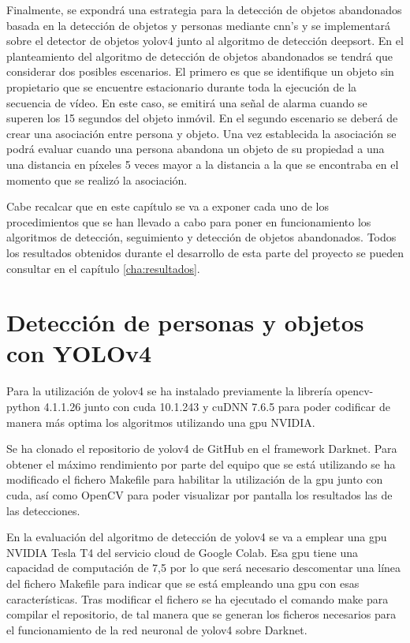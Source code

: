Finalmente, se expondrá una estrategia para la detección de objetos abandonados basada en la detección de objetos y personas mediante \gls{cnn}'s y se implementará sobre el detector de objetos \gls{yolov4} junto al algoritmo de detección \gls{deepsort}. En el planteamiento del algoritmo de detección de objetos abandonados se tendrá que considerar dos posibles escenarios. El primero es que se identifique un objeto sin propietario que se encuentre estacionario durante toda la ejecución de la secuencia de vídeo. En este caso, se emitirá una señal de alarma cuando se superen los 15 segundos del objeto inmóvil. En el segundo escenario se deberá de crear una asociación entre persona y objeto. Una vez establecida la asociación se podrá evaluar cuando una persona abandona un objeto de su propiedad a una una distancia en píxeles 5 veces mayor a la distancia a la que se encontraba en el momento que se realizó la asociación.

Cabe recalcar que en este capítulo se va a exponer cada uno de los procedimientos que se han llevado a cabo para poner en funcionamiento los algoritmos de detección, seguimiento y detección de objetos abandonados. Todos los resultados obtenidos durante el desarrollo de esta parte del proyecto se pueden consultar en el capítulo \ref{cha:resultados}.

\section{Detección de personas y objetos con YOLOv4}
\label{sec:desarrollo-yolov4}



Para la utilización de \gls{yolov4} se ha instalado previamente la librería opencv-python 4.1.1.26 junto con \gls{cuda} 10.1.243 y cuDNN 7.6.5 para poder codificar de manera más optima los algoritmos utilizando una \gls{gpu} NVIDIA.

Se ha clonado el repositorio de \gls{yolov4} de GitHub \cite{yolov4-darknet-github} en el framework Darknet. Para obtener el máximo rendimiento por parte del equipo que se está utilizando se ha modificado el fichero Makefile para habilitar la utilización de la \gls{gpu} junto con \gls{cuda}, así como OpenCV para poder visualizar por pantalla los resultados las de las detecciones.

En la evaluación del algoritmo de detección de \gls{yolov4} se va a emplear una \gls{gpu} NVIDIA Tesla T4 del servicio cloud de Google Colab. Esa \gls{gpu} tiene una capacidad de computación de 7,5 por lo que será necesario descomentar una línea del fichero Makefile para indicar que se está empleando una \gls{gpu} con esas características. Tras modificar el fichero se ha ejecutado el comando make para compilar el repositorio, de tal manera que se generan los ficheros necesarios para el funcionamiento de la red neuronal de \gls{yolov4} sobre Darknet. 

